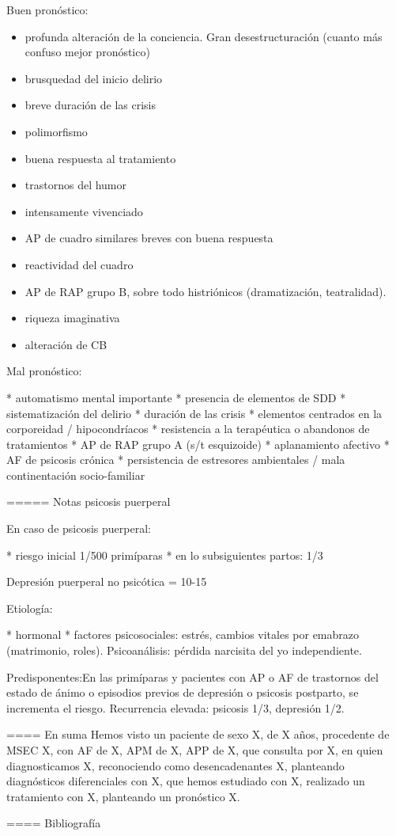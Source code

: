Buen pronóstico:
\begin{itemize}
\item profunda alteración de la conciencia. Gran desestructuración (cuanto más confuso mejor pronóstico)
\item brusquedad del inicio delirio
\item breve duración de las crisis
\item polimorfismo
\item buena respuesta al tratamiento
\item trastornos del humor
\item intensamente vivenciado
\item AP de cuadro similares breves con buena respuesta
\item reactividad del cuadro
\item AP de RAP grupo B, sobre todo histriónicos (dramatización, teatralidad).
\item riqueza imaginativa
\item alteración de CB
\end{itemize}
Mal pronóstico:

* automatismo mental importante
* presencia de elementos de SDD
* sistematización del delirio
* duración de las crisis
* elementos centrados en la corporeidad / hipocondríacos
* resistencia a la terapéutica o abandonos de tratamientos
* AP de RAP grupo A (s/t esquizoide)
* aplanamiento afectivo
* AF de psicosis crónica
* persistencia de estresores ambientales / mala continentación socio-familiar

===== Notas psicosis puerperal

En caso de psicosis puerperal:

* riesgo inicial 1/500 primíparas
* en lo subsiguientes partos: 1/3

Depresión puerperal no psicótica = 10-15%

Etiología:

* hormonal
* factores psicosociales: estrés, cambios vitales por emabrazo (matrimonio, roles). Psicoanálisis: pérdida narcisita del yo independiente.

Predisponentes:En las primíparas y pacientes con AP o AF de trastornos del estado de ánimo o episodios previos de depresión o psicosis postparto, se incrementa el riesgo.
Recurrencia elevada: psicosis 1/3, depresión 1/2.

==== En suma
Hemos visto un paciente de sexo X, de X años, procedente de MSEC X, con AF de X, APM de X, APP de X, que consulta por X, en quien diagnosticamos X, reconociendo como desencadenantes X, planteando diagnósticos diferenciales con X, que hemos estudiado con X, realizado un tratamiento con X, planteando un pronóstico X.

==== Bibliografía
